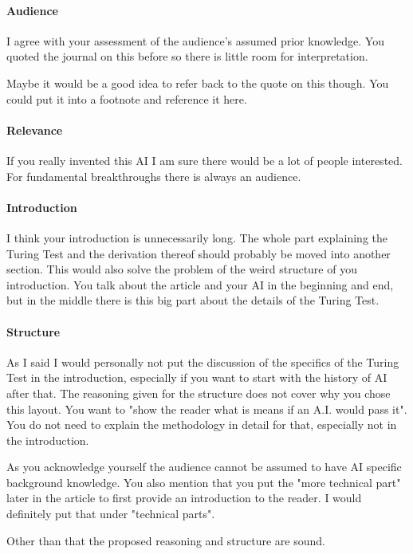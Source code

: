 \documentclass[12pt, a4paper]{article}
\begin{document}
\paragraph{Audience}
I agree with your assessment of the audience's assumed prior knowledge. You quoted the journal on this before so there is little room for interpretation.

Maybe it would be a good idea to refer back to the quote on this though. You could put it into a footnote and reference it here.

\paragraph{Relevance}
If you really invented this AI I am sure there would be a lot of people interested. For fundamental breakthroughs there is always an audience.

\paragraph{Introduction}
I think your introduction is unnecessarily long. The whole part explaining the Turing Test and the derivation thereof should probably be moved into another section.
This would also solve the problem of the weird structure of you introduction. You talk about the article and your AI in the beginning and end, but in the middle there is this big part about the details of the Turing Test.

\paragraph{Structure}
As I said I would personally not put the discussion of the specifics of the Turing Test in the introduction, especially if you want to start with the history of AI after that. The reasoning given for the structure does not cover why you chose this layout. You want to "show the reader what is means if an A.I. would pass it". You do not need to explain the methodology in detail for that, especially not in the introduction.

As you acknowledge yourself the audience cannot be assumed to have AI specific background knowledge. You also mention that you put the "more technical part" later in the article to first provide an introduction to the reader. I would definitely put that under "technical parts".

Other than that the proposed reasoning and structure are sound.
\end{document}
